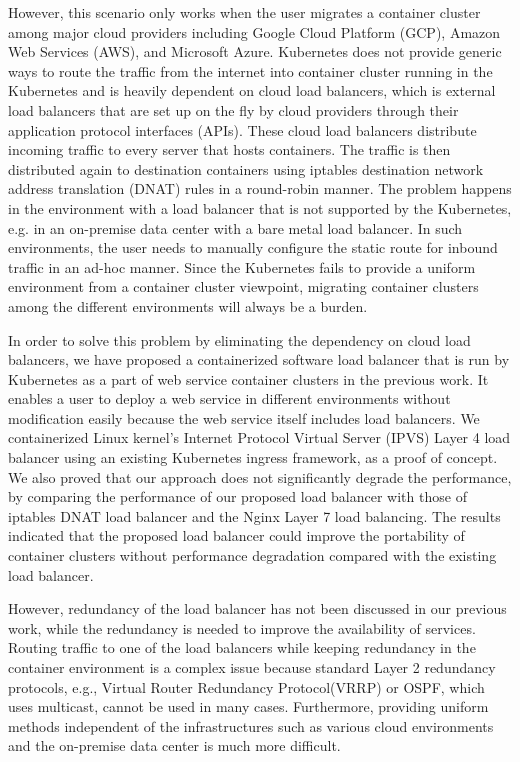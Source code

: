 However, this scenario only works when the user migrates a container cluster among major cloud providers including Google Cloud Platform (GCP), 
Amazon Web Services (AWS), and Microsoft Azure.
Kubernetes does not provide generic ways to route the traffic from the internet into container cluster running in the Kubernetes and is 
heavily dependent on cloud load balancers, which is external load balancers that are set up on the fly by cloud providers through their application protocol interfaces (APIs).
%
These cloud load balancers distribute incoming traffic to every server that hosts containers.
The traffic is then distributed again to destination containers using iptables destination 
network address translation (DNAT)\cite{MartinA.Brown2017,Marmol2015} rules in a round-robin manner. 
The problem happens in the environment with a load balancer that is not supported by the Kubernetes, 
e.g. in an on-premise data center with a bare metal load balancer. 
In such environments, the user needs to manually configure 
the static route for inbound traffic in an ad-hoc manner. 
Since the Kubernetes fails to provide a uniform environment from a container cluster viewpoint,
migrating container clusters among the different environments will always be a burden.

In order to solve this problem by eliminating the dependency on cloud load balancers,
we have proposed a containerized software load balancer that is run by Kubernetes as  
a part of web service container clusters in the previous work\cite{takahashi2018portable}.
It enables a user to deploy a web service in different environments without modification easily 
because the web service itself includes load balancers.
%
We containerized Linux kernel's Internet Protocol Virtual Server (IPVS)\cite{Zhang2000} 
Layer 4 load balancer using an existing Kubernetes ingress\cite{K8sIngress2017} framework, as a proof of concept.
%
%
We also proved that our approach does not significantly degrade the performance,
by comparing the performance of our proposed load balancer with those of
iptables DNAT load balancer and the Nginx Layer 7 load balancing.
%
The results indicated that the proposed load balancer could improve the portability of container clusters without performance degradation compared with the existing load balancer.

However, redundancy of the load balancer has not been discussed in our previous work, while the redundancy is needed to improve the availability of services.%
Routing traffic to one of the load balancers while keeping redundancy in the container environment is a complex issue
because standard Layer 2 redundancy protocols, e.g., Virtual Router Redundancy Protocol(VRRP)\cite{hinden2004virtual}
or OSPF\cite{moy1997ospf}, which uses multicast, cannot be used in many cases.
Furthermore, providing uniform methods independent of the infrastructures such as various cloud environments and the on-premise data center is much more difficult.

